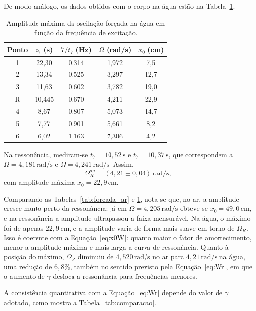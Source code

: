 \documentclass[12pt, a4paper]{article}
\newcommand{\un}[1]{\,\mathrm{#1}}
\newcommand{\fonte}[1]{\par\vspace{2pt}{\footnotesize Fonte: #1}}
\begin{document}
De modo análogo, os dados obtidos com o corpo na água estão na Tabela~\ref{tab:forcada_agua}.

\begin{table}[H]
\centering
\caption{Amplitude máxima da oscilação forçada na água em função da frequência de excitação.}
\label{tab:forcada_agua}
\begin{tabular}{ccccc}
\toprule
Ponto & $t_7$ (s) & $7/t_7$ (Hz) & $\Omega$ (rad/s) & $x_0$ (cm) \\
\midrule
1 & 22,30 & 0,314 & 1,972 & 7,5 \\
2 & 13,34 & 0,525 & 3,297 & 12,7 \\
3 & 11,63 & 0,602 & 3,782 & 19,0 \\
R & 10,445 & 0,670 & 4,211 & 22,9 \\
4 & 8,67 & 0,807 & 5,073 & 14,7 \\
5 & 7,77 & 0,901 & 5,661 & 8,2 \\
6 & 6,02 & 1,163 & 7,306 & 4,2 \\
\bottomrule
\end{tabular}
\fonte{Elaborada pelos autores.}
\end{table}

Na ressonância, mediram-se $t_7=10{,}52\un{s}$ e $t_7=10{,}37\un{s}$, que correspondem a $\Omega=4{,}181\un{rad/s}$ e $\Omega=4{,}241\un{rad/s}$. Assim,
\[
\Omega_R^{ag}=(4{,}21\pm0{,}04)\un{rad/s},
\]
com amplitude máxima $x_0=22{,}9\un{cm}$.

Comparando as Tabelas~\ref{tab:forcada_ar} e \ref{tab:forcada_agua}, nota-se que, no ar, a amplitude cresce muito perto da ressonância: já em $\Omega=4{,}205\un{rad/s}$ obteve-se $x_0=49{,}0\un{cm}$, e na ressonância a amplitude ultrapassou a faixa mensurável. Na água, o máximo foi de apenas $22{,}9\un{cm}$, e a amplitude varia de forma mais suave em torno de $\Omega_R$. Isso é coerente com a Equação~\eqref{eq:x0W}: quanto maior o fator de amortecimento, menor a amplitude máxima e mais larga a curva de ressonância. Quanto à posição do máximo, $\Omega_R$ diminuiu de $4{,}520\un{rad/s}$ no ar para $4{,}21\un{rad/s}$ na água, uma redução de $6{,}8\%$, também no sentido previsto pela Equação~\eqref{eq:Wr}, em que o aumento de $\gamma$ desloca a ressonância para frequências menores.

A consistência quantitativa com a Equação~\eqref{eq:Wr} depende do valor de $\gamma$ adotado, como mostra a Tabela~\ref{tab:comparacao}.
\end{document}
